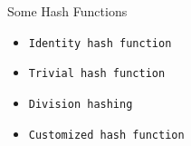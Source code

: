\begin{frame}{Some Hash Functions}
    \begin{itemize}
        \item \texttt{Identity hash function} \pause
        \item \texttt{Trivial hash function} \pause
        \item \texttt{Division hashing} \pause
        \item \texttt{Customized hash function}
    \end{itemize}
\end{frame}
